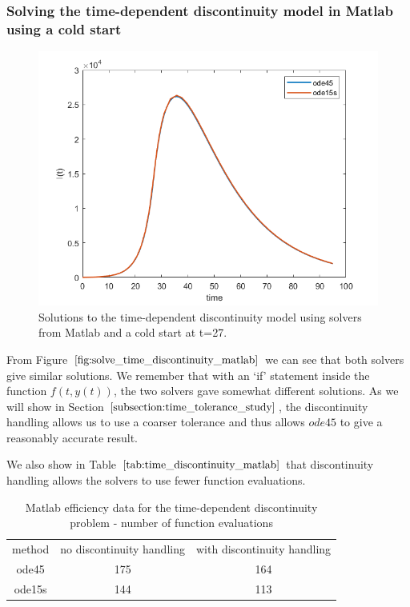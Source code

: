 \subsubsection{Solving the time-dependent discontinuity model in Matlab using a cold start}
\begin{figure}[H]
\centering
\includegraphics[width=0.7\linewidth]{./figures/solve_time_discontinuity_matlab}
\caption{Solutions to the time-dependent discontinuity model using solvers from Matlab and a cold start at t=27.}
\label{fig:solve_time_discontinuity_matlab}
\end{figure}

From Figure $\ref{fig:solve_time_discontinuity_matlab}$ we can see that both solvers give similar solutions. We remember that with an `if' statement inside the function $f(t, y(t))$, the two solvers gave somewhat different solutions. As we will show in Section $\ref{subsection:time_tolerance_study}$, the discontinuity handling allows us to use a coarser tolerance and thus allows $ode45$ to give a reasonably accurate result.

We also show in Table $\ref{tab:time_discontinuity_matlab}$ that discontinuity handling allows the solvers to use fewer function evaluations.

\begin{table}[H]
\caption {Matlab efficiency data for the time-dependent discontinuity problem - number of function evaluations} 
\label{tab:time_discontinuity_matlab} 
\begin{center}
\begin{tabular}{ c c c }
method & no discontinuity handling & with discontinuity handling \\ 
ode45 & 175 & 164 \\
ode15s & 144 & 113 \\
\end{tabular}
\end{center}
\end{table}

